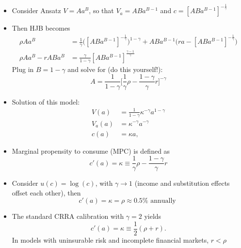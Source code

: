 \documentclass[10pt]{beamer}
\begin{document}
\begin{frame}{}
\begin{itemize}
\item Consider Ansatz $V = Aa^B$, so that $V_a = AB a^{B-1}$ and $c = [AB a^{B-1}]^{- \frac{1}{\gamma}}$

\item Then HJB becomes
\begin{align*}
	\rho A a^B &= \frac{1}{\gamma} \bigg( [AB a^{B-1}]^{- \frac{1}{\gamma}} \bigg)^{1-\gamma} + AB a^{B-1} \bigg( r a - [AB a^{B-1}]^{- \frac{1}{\gamma}} \bigg) \\
	\rho A a^B - r A B a^B &= \frac{\gamma}{1-\gamma} [A B a^{B-1}]^\frac{\gamma-1}{\gamma}
\end{align*}
Plug in $B = 1-\gamma$ and solve for (do this yourself!):
\begin{equation*}
	A = \frac{1}{1-\gamma} \bigg[ \frac{1}{\gamma} \rho - \frac{1-\gamma}{\gamma} r \bigg]^{-\gamma}
\end{equation*}

\item Solution of this model:
\begin{align*}
	V(a) &= \frac{1}{1-\gamma} \kappa^{-\gamma} a^{1-\gamma} \\
	V_a(a) &= \kappa^{-\gamma} a^{-\gamma} \\
	c(a) &= \kappa a,
\end{align*}
\end{itemize}
\end{frame}




\begin{frame}{}
\begin{itemize}
\item Marginal propensity to consume (MPC) is defined as
\begin{equation*}
	c'(a) = \kappa \equiv \frac{1}{\gamma} \rho - \frac{1-\gamma}{\gamma} r
\end{equation*}

\item Consider $u(c) = \log(c)$, with $\gamma \to 1$ (income and substitution effects offset each other), then 
\begin{equation*}
	c'(a) = \kappa = \rho \approx 0.5 \% \text{ annually }
\end{equation*}

\item The standard CRRA calibration with $\gamma = 2$ yields
\begin{equation*}
	c'(a) = \kappa \equiv \frac{1}{2} (\rho + r).
\end{equation*}
In models with uninsurable risk and incomplete financial markets, $r < \rho$

\end{itemize}
\end{frame}
\end{document}
